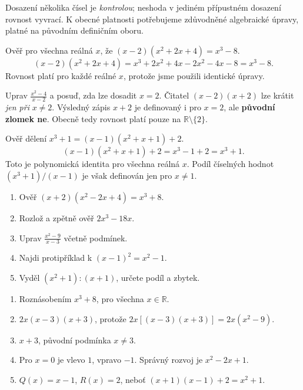 \documentclass[11pt,a4paper]{article}
\begin{document}
Dosazení několika čísel je \emph{kontrolou}; neshoda v jediném přípustném dosazení rovnost vyvrací. K obecné platnosti potřebujeme zdůvodněné algebraické úpravy, platné na původním definičním oboru.
\begin{prikladReseniBox}[breakable=false,title={Příklad 1}]
Ověř pro všechna reálná $x$, že $(x-2)(x^2+2x+4)=x^3-8$.
\tcblower
\[(x-2)(x^2+2x+4)=x^3+2x^2+4x-2x^2-4x-8=x^3-8.\]
Rovnost platí pro každé reálné $x$, protože jsme použili identické úpravy.
\end{prikladReseniBox}
\begin{prikladReseniBox}[breakable=false,title={Příklad 2}]
Uprav $\frac{x^2-4}{x-2}$ a posuď, zda lze dosadit $x=2$.
\tcblower
Čitatel $(x-2)(x+2)$ lze krátit \emph{jen při} $x\ne2$. Výsledný zápis $x+2$ je definovaný i pro $x=2$, ale \textbf{původní zlomek ne}. Obecně tedy rovnost platí pouze na $\mathbb R\setminus\{2\}$.
\end{prikladReseniBox}
\begin{prikladReseniBox}[breakable=false,title={Příklad 3}]
Ověř dělení $x^3+1=(x-1)(x^2+x+1)+2$.
\tcblower
\[(x-1)(x^2+x+1)+2=x^3-1+2=x^3+1.\]
Toto je polynomická identita pro všechna reálná $x$. Podíl číselných hodnot $(x^3+1)/(x-1)$ je však definován jen pro $x\ne1$.
\end{prikladReseniBox}
\begin{zadaniReseniBox}[breakable=false,title={Samostatná práce 1}]
\begin{enumerate}[label=\alph*)]
\item Ověř $(x+2)(x^2-2x+4)=x^3+8$.
\item Rozlož a zpětně ověř $2x^3-18x$.
\item Uprav $\frac{x^2-9}{x-3}$ včetně podmínek.
\item Najdi protipříklad k $(x-1)^2=x^2-1$.
\item Vyděl $(x^2+1):(x+1)$, určete podíl a zbytek.
\end{enumerate}
\tcblower
\begin{enumerate}[label=\alph*)]
\item Roznásobením $x^3+8$, pro všechna $x\in\mathbb R$.
\item $2x(x-3)(x+3)$, protože $2x[(x-3)(x+3)]=2x(x^2-9)$.
\item $x+3$, původní podmínka $x\ne3$.
\item Pro $x=0$ je vlevo $1$, vpravo $-1$. Správný rozvoj je $x^2-2x+1$.
\item $Q(x)=x-1$, $R(x)=2$, neboť $(x+1)(x-1)+2=x^2+1$.
\end{enumerate}
\end{zadaniReseniBox}
\end{document}
